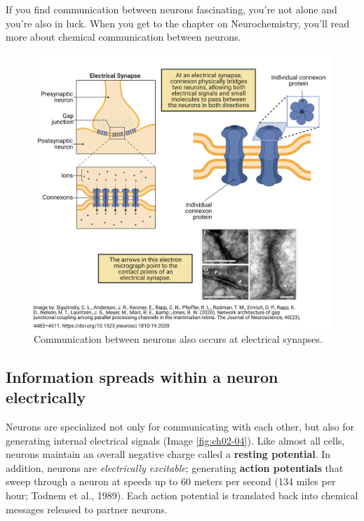 \documentclass[
]{book}
\begin{document}
If you find communication between neurons fascinating, you're not alone and you're also in luck. When you get to the chapter on Neurochemistry, you'll read more about chemical communication between neurons.

\begin{figure}

{\centering \includegraphics[width=0.9\linewidth]{images/ch02/02_03} 

}

\caption{Communication between neurons also occurs at electrical synapses.}\label{fig:ch02-03}
\end{figure}

\hypertarget{information-spreads-within-a-neuron-electrically}{%
\subsection{Information spreads within a neuron electrically}\label{information-spreads-within-a-neuron-electrically}}

Neurons are specialized not only for communicating with each other, but also for generating internal electrical signals (Image \ref{fig:ch02-04}). Like almost all cells, neurons maintain an overall negative charge called a \textbf{resting potential}. In addition, neurons are \emph{electrically excitable}; generating \textbf{action potentials} that sweep through a neuron at speeds up to 60 meters per second (134 miles per hour; Todnem et al., 1989). Each action potential is translated back into chemical messages released to partner neurons.
\end{document}
